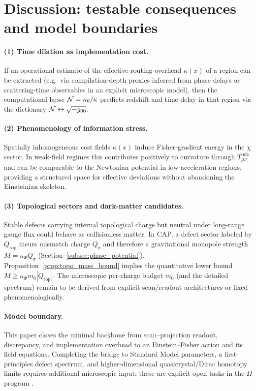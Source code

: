\section{Discussion: testable consequences and model boundaries}
\label{sec:discussion}

\paragraph{(1) Time dilation as implementation cost.}
If an operational estimate of the effective routing overhead $\kappa(x)$ of a region can be extracted (e.g.\ via compilation-depth proxies inferred from phase delays or scattering-time observables in an explicit microscopic model), then the computational lapse $\mathcal{N}=\kappa_0/\kappa$ predicts redshift and time delay in that region via the dictionary $\mathcal{N}\leftrightarrow \sqrt{-g_{00}}$.

\paragraph{(2) Phenomenology of information stress.}
Spatially inhomogeneous cost fields $\kappa(x)$ induce Fisher-gradient energy in the $\chi$ sector. In weak-field regimes this contributes positively to curvature through $T^{\mathrm{info}}_{\mu\nu}$ and can be comparable to the Newtonian potential in low-acceleration regions, providing a structured space for effective deviations without abandoning the Einsteinian skeleton.

\paragraph{(3) Topological sectors and dark-matter candidates.}
Stable defects carrying internal topological charge but neutral under long-range gauge flux could behave as collisionless matter. In CAP, a defect sector labeled by $Q_{\mathrm{top}}$ incurs mismatch charge $Q_\sigma$ and therefore a gravitational monopole strength $M=\kappa_\Phi Q_\sigma$ (Section~\ref{subsec:phase_potential}). Proposition~\ref{prop:topo_mass_bound} implies the quantitative lower bound $M\ge \kappa_\Phi m_0 |Q_{\mathrm{top}}|$. The microscopic per-charge budget $m_0$ (and the detailed spectrum) remain to be derived from explicit scan/readout architectures or fixed phenomenologically.

\paragraph{Model boundary.}
This paper closes the minimal backbone from scan--projection readout, discrepancy, and implementation overhead to an Einstein--Fisher action and its field equations. Completing the bridge to Standard Model parameters, a first-principles defect spectrum, and higher-dimensional quasicrystal/Dirac homotopy limits requires additional microscopic input; these are explicit open tasks in the $\Omega$ program \cite{Ma2025FoP}.


